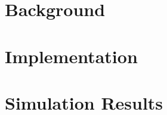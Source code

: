 \documentclass[12pt,twoside]{mitthesis}
\begin{document}
\part{Background}





%

\part{Implementation}






\part{Simulation Results}


%
%


\begin{singlespace}


\end{singlespace}
\end{document}
